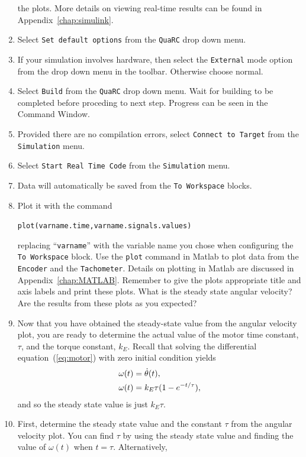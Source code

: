 \begin{enumerate}
the plots.  More details on viewing real-time results can be found in
Appendix~\ref{chap:simulink}\@.
\item Select \verb|Set default options| from the \verb|QuaRC| drop down menu.
\item If your simulation involves hardware, then select the \verb|External|
mode option from the drop down menu in the toolbar. Otherwise choose normal.
\item Select \verb|Build| from the \verb|QuaRC| drop down menu.  Wait for
building to be completed before proceding to next step. Progress can be seen
in the Command Window.
\item Provided there are no compilation errors, select
\verb|Connect to Target| from the \verb|Simulation| menu.
\item Select \verb|Start Real Time Code| from the \verb|Simulation| menu.
\item Data will automatically be saved from the \verb|To Workspace| blocks.
\item Plot it with the command
\begin{center}
\verb|plot(varname.time,varname.signals.values)|
\end{center}
replacing ``\verb|varname|'' with the variable name you chose when
configuring the \verb|To Workspace| block.  Use the \verb|plot| command in
\textsf{Matlab} to plot data from the \verb|Encoder| and the
\verb|Tachometer|.  Details on plotting in \textsf{Matlab} are discussed in
Appendix~\ref{chap:MATLAB}\@.  Remember to give the plots appropriate title
and axis labels and print these plots. What is the steady state angular
velocity?  Are the results from these plots as you expected?
\item Now that you have obtained the steady-state value from the angular
velocity plot, you are ready to determine the actual value of the motor time
constant, $\tau$, and the torque constant, $k_{E}$\@.  Recall that solving
the differential equation~(\ref{eq:motor}) with zero initial condition yields
\begin{align}\notag
\omega(t)=&\;\dot\theta(t),\\\label{eq:motorSoln}
\omega(t)=&\;k_{E}\tau (1-e^{-t/\tau}),
\end{align}
and so the steady state value is just $k_{E}\tau$\@.
\item First, determine the steady state value and the constant $\tau$ from
the angular velocity plot.  You can find $\tau$ by using the steady state
value and finding the value of $\omega(t)$ when $t=\tau$\@.  Alternatively,

\end{enumerate}
